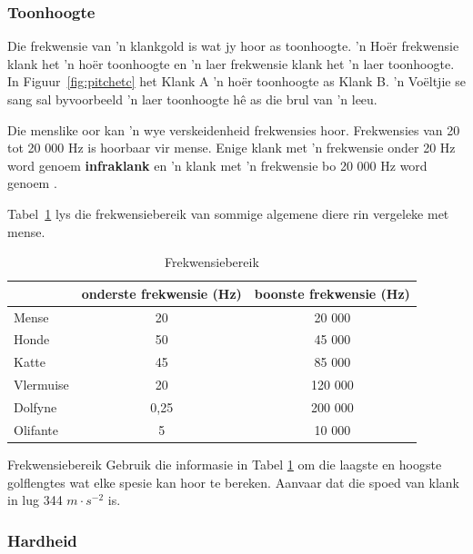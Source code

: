             \subsubsection{Toonhoogte}
            \nopagebreak
            
Die frekwensie van 'n klankgold is wat jy hoor as toonhoogte. 'n Ho\"er frekwensie klank het 'n ho\"er toonhoogte en 'n laer frekwensie klank het 'n laer toonhoogte. In Figuur~\ref{fig:pitchetc} het Klank A 'n ho\"er toonhoogte as Klank B. 'n Vo\"eltjie se sang sal byvoorbeeld 'n laer toonhoogte h\^e as die brul van 'n leeu.\par

Die menslike oor kan 'n wye verskeidenheid frekwensies hoor. Frekwensies van 20 tot 20 000 Hz is hoorbaar vir mense. Enige klank met 'n frekwensie onder 20 Hz word genoem \textbf{infraklank} en 'n klank met 'n frekwensie bo 20 000 Hz word genoem .\par


Tabel~\ref{p:wsl:s11:rangeoff} lys die frekwensiebereik van sommige algemene diere rin vergeleke met mense.

\begin{table}[htbp]
\begin{center}
\caption{Frekwensiebereik}
\label{p:wsl:s11:rangeoff}
\begin{tabular}{|l|c|c|}\hline
&onderste frekwensie (Hz) & boonste frekwensie (Hz)\\\hline\hline
Mense & 20 & 20 000\\\hline
Honde & 50 & 45 000\\\hline
Katte & 45 & 85 000\\\hline
Vlermuise & 20 & 120 000\\\hline
Dolfyne & 0,25 & 200 000\\\hline
Olifante & 5 & 10 000\\\hline
\hline
\end{tabular}
\end{center}
\end{table}
    \par
\begin{activity}{Frekwensiebereik}
\nopagebreak
Gebruik die informasie in Tabel \ref{p:wsl:s11:rangeoff} om die laagste en hoogste golflengtes wat elke spesie kan hoor te bereken. Aanvaar dat die spoed van klank in lug 344 $m \cdot s^{-2}$ is.
\end{activity}
 
\subsubsection{Hardheid}
\nopagebreak

